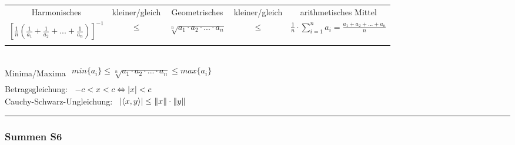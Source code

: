 \begin{tabulary}{14cm}{ccccc}
\color{green} Harmonisches\color{black} 	& kleiner/gleich 	& \color{red} Geometrisches\color{black} 	& kleiner/gleich & \color{blue} arithmetisches Mittel\color{black}\\


\color{green}$\left[\frac{1}{ n}(  \frac{1}{a_{1}} + \frac{1}{a_{2}} +...+\frac{1}{a_{n}} )\right]^{-1}  $ \color{black} &
$\leq$ & \color{red} $\sqrt[n]{a_{1}\cdot a_{2}\cdot ...\cdot a_{n}}$\color{black} & 
$\leq$ & \color{blue}$\frac{1}{n} \cdot \sum\limits_{i = 1}^{n}a_{i} = \frac{a_{1}+a_{2}+...+a_{n}}{n}$
  \\
\color{black}\\

\end{tabulary}\\
 	

Minima/Maxima \qquad \qquad \qquad
\begin{math}\begin{array}{l}
	min\{a_{i}\} \leq \sqrt[n]{a_{1}\cdot a_{2}\cdot ...\cdot a_{n}} \leq max\{a_{i}\} \\
\end{array}\end{math} \\


Betragsgleichung: \qquad \qquad \qquad 
\begin{math}\begin{array}{l}
-c<x<c\Leftrightarrow \left\vert x\right\vert < c \\
\end{array}\end{math} \\


Cauchy-Schwarz-Ungleichung: \qquad
\begin{math}\begin{array}{l}
\left| \sprod{x}{y} \right| \le \| x\| \cdot \| y\|
\end{array}\end{math} \\
\hrule


\subsubsection{Summen \color{red} S6} %
\color{black}
\label{sub:allgemeines}
